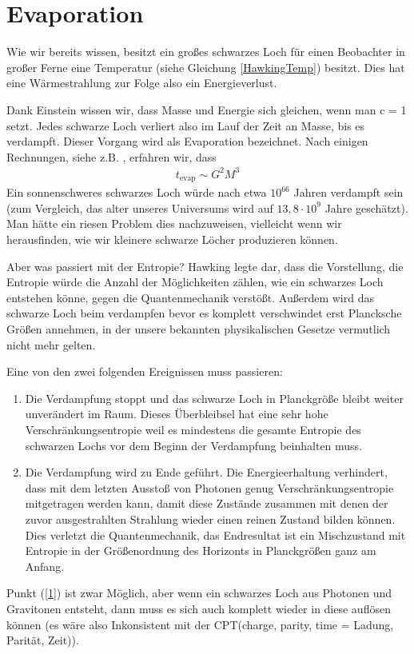 \documentclass[ngerman]{scrartcl}
\begin{document}
\FloatBarrier
\section{Evaporation \checkmark} \label{evaporation}

Wie wir bereits wissen, besitzt ein großes schwarzes Loch für einen Beobachter in großer Ferne eine Temperatur (siehe Gleichung \eqref{HawkingTemp}) besitzt. Dies hat eine Wärmestrahlung zur Folge also ein Energieverlust.

Dank Einstein wissen wir, dass Masse und Energie sich gleichen, wenn man c = 1 setzt. Jedes schwarze Loch verliert also im Lauf der Zeit an Masse, bis es verdampft. Dieser Vorgang wird als Evaporation bezeichnet. Nach einigen Rechnungen, siehe z.B. \cite{JerusalemsLectures}, erfahren wir, dass
	\begin{align}
		t_{\text{evap}} \sim G^2 M^3
	\end{align} 
Ein sonnenschweres schwarzes Loch würde nach etwa $10^{66}$ Jahren verdampft sein (zum Vergleich, das alter unseres Universums wird auf $13,8 \cdot 10^{9}$ Jahre geschätzt). Man hätte ein riesen Problem dies nachzuweisen, vielleicht wenn wir herausfinden, wie wir kleinere schwarze Löcher produzieren können. 

Aber was passiert mit der Entropie?
Hawking \cite{BreakdownGravitationalCollapse} legte dar, dass die Vorstellung, die Entropie würde die Anzahl der Möglichkeiten zählen, wie ein schwarzes Loch entstehen könne, gegen die Quantenmechanik verstößt.
Außerdem wird das schwarze Loch beim verdampfen bevor es komplett verschwindet erst Plancksche Größen annehmen, in der unsere bekannten physikalischen Gesetze vermutlich nicht mehr gelten. 

Eine von den zwei folgenden Ereignissen muss passieren:
	\begin{enumerate}[(1)]
		\item Die Verdampfung stoppt und das schwarze Loch in Planckgröße bleibt weiter unverändert im Raum. Dieses Überbleibsel hat eine sehr hohe Verschränkungsentropie weil es mindestens die gesamte Entropie des schwarzen Lochs vor dem Beginn der Verdampfung beinhalten muss. \label{1}
		
		\item Die Verdampfung wird zu Ende geführt. Die Energieerhaltung verhindert, dass mit dem letzten Ausstoß von Photonen genug Verschränkungsentropie mitgetragen werden kann, damit diese Zustände zusammen mit denen der zuvor ausgestrahlten Strahlung wieder einen reinen Zustand bilden können. Dies verletzt die Quantenmechanik, das Endresultat ist ein Mischzustand mit Entropie in der Größenordnung des Horizonts in Planckgrößen ganz am Anfang.  \label{2}
	\end{enumerate}
Punkt (\ref{1}) ist zwar Möglich, aber wenn ein schwarzes Loch aus Photonen und Gravitonen entsteht, dann muss es sich auch komplett wieder in diese auflösen können (es wäre also Inkonsistent mit der CPT(charge, parity, time = Ladung, Parität, Zeit)).
\end{document}
